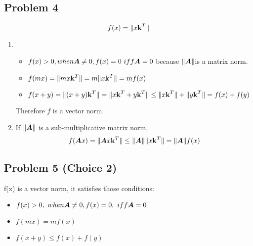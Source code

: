 \documentclass{article}
\begin{document}
\hypertarget{problem_4_prove_or_disprove_3}{}
\subsection*{{Problem 4}}
\label{problem_4_prove_or_disprove_3}
\begin{align}
f(x)=\|x\boldsymbol{\mathrm{k}}^T\|
\end{align}

\begin{enumerate}
\item 
\begin{itemize} 
	\item  $f(x)>0, when \mA\neq0, \\ f(x)=0\ iff \mA=0 $ because $\|\boldsymbol{A}\| $is a matrix norm. 
	\item  $f(mx) = \|mx\boldsymbol{\mathrm{k}}^T\| =m\|x\boldsymbol{\mathrm{k}}^T\| = mf(x) $ 
	\item $f(x+y) = \|(x+y)\boldsymbol{\mathrm{k}}^T\| = \|x\boldsymbol{\mathrm{k}}^T+y\boldsymbol{\mathrm{k}}^T\| \leq \|x\boldsymbol{\mathrm{k}}^T\|+\|y\boldsymbol{\mathrm{k}}^T\| = f(x)+f(y)$
\end{itemize}
Therefore $f$ is a vector norm. 

\item If $\|\boldsymbol{A}\|$ is a sub-multiplicative matrix norm, 
\begin{align}
f(\boldsymbol{A} x)=\|\boldsymbol{A} x\boldsymbol{\mathrm{k}}^T\| \leq \|\boldsymbol{A}\| \|x\boldsymbol{\mathrm{k}}^T\| = \|\boldsymbol{A}\| f(x) 
\end{align}
\end{enumerate}

\hypertarget{problem_5_prove_or_disprove_3}{}
\subsection*{{Problem 5  (Choice 2) }}
\label{problem_5_prove_or_disprove_3}
 f(x) is a vector norm, it satisfies those conditions: \\
 \begin{itemize}
	\item $f(x)>0, \ when \boldsymbol{A}\neq0, \\ f(x)=0,\ iff \boldsymbol{A}=0 $ 
	\item  $f(mx) = mf(x) $ 
	\item $f(x+y)  \leq  f(x)+f(y)$
 \end{itemize}
\end{document}
